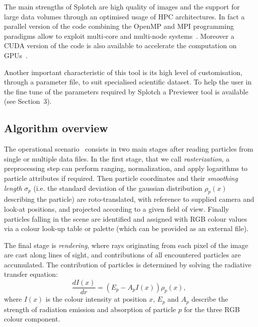 \documentclass{egpubl}
\begin{document}
The main strengths of Splotch are high quality of images and the support for large data volumes through an optimised usage of HPC architectures. In fact a parallel version of the code combining the OpenMP and MPI programming paradigms allow to exploit multi-core and multi-node systems~\cite{JKR*10}. Moreover a CUDA version of the code is also available to accelerate the computation on GPUs~\cite{RGD*14}. 

Another important characteristic of this tool is its high level of customisation, through a parameter file, to suit specialised scientific dataset. To help the user in the fine tune of the parameters required by Splotch a Previewer tool is available (see Section~3).

\subsection{Algorithm overview }

The operational scenario~\cite{DRGI08} consists in two main stages after reading particles from single or multiple data files. 
In the first stage, that we call \textit{rasterization}, a preprocessing step can perform ranging, normalization, and apply logarithms to particle attributes if required. Then particle coordinates and their \textit{smoothing length} $\sigma_p$ (i.e. the standard deviation of the gaussian distribution $\rho_p(x)$ describing the particle) are roto-translated, with reference to supplied camera and look-at positions, and projected according to a given field of view. Finally particles falling in the scene are identified and assigned with RGB colour values via a colour look-up table or palette (which can be provided as an external file).

The final stage is \textit{rendering}, where rays originating from each pixel of the image are cast along lines of sight, and contributions of all encountered particles are accumulated. The contribution of particles is determined by solving the radiative transfer equation:
\begin{equation}\label{rad}
 \frac{d I(x)}{dr}=( E_p- A_p I(x))\rho_p(x),
\end{equation}
where $I(x)$ is the colour intensity at position $x$, $E_p$ and $A_p$ describe the strength of radiation emission and absorption of particle $p$ for the three RGB colour component.

\end{document}
